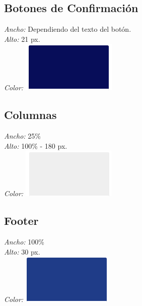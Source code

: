 \subsection{Botones de Confirmación}

\noindent \textit{Ancho:} Dependiendo del texto del botón.\\
\textit{Alto:} 21 px.\\
\textit{Color:} \includegraphics[scale=1]{imagenes/iconografia/ColorBoton.png}\\

\subsection{Columnas}

\noindent \textit{Ancho:} 25\%\\
\textit{Alto:} 100\% - 180 px.\\
\textit{Color:} \includegraphics[scale=1]{imagenes/iconografia/ColorColumnas.png}\\

\subsection{Footer}

\noindent \textit{Ancho:} 100\%\\
\textit{Alto:} 30 px.\\
\textit{Color:} \includegraphics[scale=1]{imagenes/iconografia/ColorMenu.png}\\